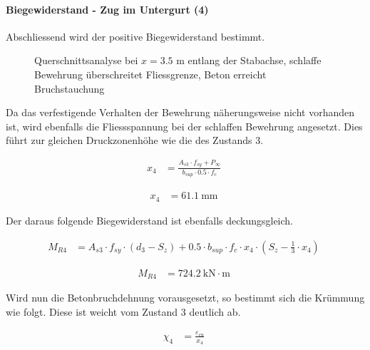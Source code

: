 \documentclass[
  11pt,
  letterpaper,
]{scrreprt}
\let\oldparagraph\paragraph
\renewcommand{\paragraph}[1]{\oldparagraph{#1}\mbox{}}
\begin{document}
\paragraph{Biegewiderstand - Zug im Untergurt
(4)}\label{biegewiderstand---zug-im-untergurt-4}

Abschliessend wird der positive Biegewiderstand bestimmt.

\begin{figure}[H]


\caption{\label{fig-t6_qs_My_neg}Querschnittsanalyse bei \(x=3.5\) m
entlang der Stabachse, schlaffe Bewehrung überschreitet Fliessgrenze,
Beton erreicht Bruchstauchung}

\end{figure}%

Da das verfestigende Verhalten der Bewehrung näherungsweise nicht
vorhanden ist, wird ebenfalls die Fliessspannung bei der schlaffen
Bewehrung angesetzt. Dies führt zur gleichen Druckzonenhöhe wie die des
Zustands \(3\).

$$
\begin{aligned}
x_{4} &= \frac{ A_{s3} \cdot f_{sy} + P_{\infty} }{ b_{sup} \cdot 0.5 \cdot f_{c} } \; 
\end{aligned}
$$

$$
\begin{aligned}
x_{4} &= 61.1\ \mathrm{mm} \;
\end{aligned}
$$

Der daraus folgende Biegewiderstand ist ebenfalls deckungsgleich.

$$
\begin{aligned}
M_{R4} &= A_{s3} \cdot f_{sy} \cdot \left( d_{3} - S_{z} \right) + 0.5 \cdot b_{sup} \cdot f_{c} \cdot x_{4} \cdot \left( S_{z} - \frac{ 1 }{ 3 } \cdot x_{4} \right) \; 
\end{aligned}
$$

$$
\begin{aligned}
M_{R4} &= 724.2\ \mathrm{kN} \cdot \mathrm{m} \;
\end{aligned}
$$

Wird nun die Betonbruchdehnung vorausgesetzt, so bestimmt sich die
Krümmung wie folgt. Diese ist weicht vom Zustand \(3\) deutlich ab.

$$
\begin{aligned}
\chi_{4} &= \frac{ \varepsilon_{cu} }{ x_{4} } \; 
\end{aligned}
$$
\end{document}
